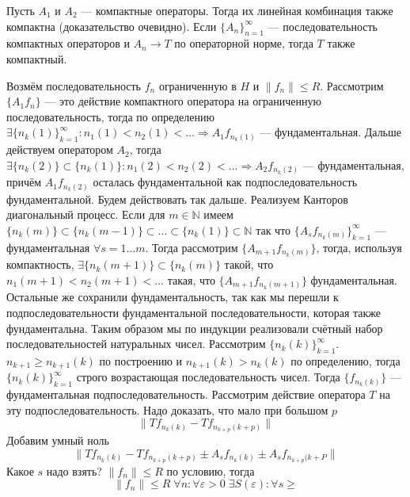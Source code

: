 \documentclass[12pt]{article}
\begin{document}
\begin{Utv}
    Пусть $A_1$ и $A_2$ --- компактные операторы.
    Тогда их линейная комбинация также компактна (доказательство очевидно).
    Если $\{A_n\}_{n = 1}^\infty$ --- последовательность компактных операторов 
    и $A_n \to T$ по операторной норме, тогда
    $T$ также компактный.
\end{Utv}
\begin{Proof}
    Возмём последовательность $f_n$ ограниченную в $H$ и $\|f_n\| \le R$.
    Рассмотрим $\{A_1 f_n\}$ --- это действие компактного оператора на 
    ограниченную последовательность, тогда по
    определению $\exists \{n_k(1)\}_{k = 1}^\infty \colon n_1(1) < n_2(1) < 
    \dots \Rightarrow A_1 f_{n_k(1)}$ ---
    фундаментальная.
    Дальше действуем оператором $A_2$, тогда $\exists \{n_k(2)\} \subset 
    \{n_k(1)\} \colon n_1(2) < n_2(2) < \dots 
    \Rightarrow A_2 f_{n_k(2)}$ --- фундаментальная, причём $A_1 f_{n_k(2)}$ 
    осталась фундаментальной как
    подпоследовательность фундаментальной.
    Будем действовать так дальше.
    Реализуем Канторов диагональный процесс.
    Если для $m \in \mathbb N$ имеем $\{n_k(m)\} \subset \{n_k(m - 1)\} 
    \subset \dots \subset \{n_k(1)\} \subset \mathbb N$
    так что $\{A_s f_{n_k(m)}\}_{k = 1}^{\infty}$ --- фундаментальная $\forall 
    s = 1 \dots m$.
    Тогда рассмотрим $\{A_{m + 1} f_{n_k(m)}\}$, тогда, используя 
    компактность, $\exists \{n_k(m + 1)\} \subset \{n_k(m)\}$
    такой, что $n_1(m + 1) < n_2(m + 1) < \dots$ такая, что $\{A_{m + 1} 
    f_{n_k(m + 1)}\}$ фундаментальная.
    Остальные же сохранили фундаментальность, так как мы перешли к 
    подпоследовательности фундаментальной 
    последовательности, которая также фундаментальна.
    Таким образом мы по индукции реализовали счётный набор последовательностей 
    натуральных чисел.
    Рассмотрим $\{n_k(k)\}_{k = 1}^\infty$.
    $n_{k + 1} \ge n_{k + 1}(k)$ по построению и $n_{k + 1}(k) > n_k(k)$ по 
    определению, тогда $\{n_k(k)\}_{k = 1}^\infty$
    строго возрастающая последовательность чисел.
    Тогда $\{f_{n_k(k)}\}$ --- фундаментальная подпоследовательность.
    Рассмотрим действие оператора $T$ на эту подпоследовательность.
    Надо доказать, что мало при большом $p$
    $$
    \|T f_{n_k(k)} - T f_{n_{k + p}(k + p)}\|
    $$
    Добавим умный ноль
    $$
    \|T f_{n_k(k)} -T f_{n_{k + p}(k + p)} \pm A_s f_{n_k(k)} \pm 
    A_s f_{n_{k + p}(k + P}\|
    $$
    Какое $s$ надо взять?
    $\|f_n\| \le R$ по условию, тогда 
    $$
    \|f_n\| \le R\; \forall n \colon \forall
    \varepsilon > 0\; \exists S(\varepsilon)\colon \forall s \ge 
$$
\end{Proof}
\end{document}
